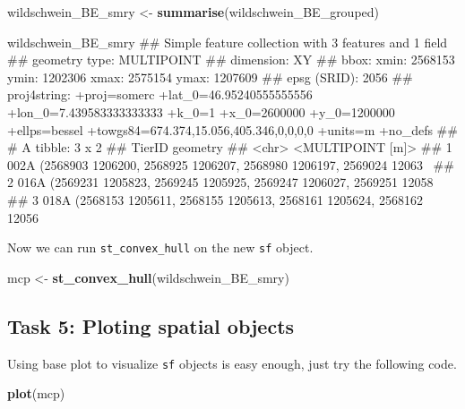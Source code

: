 \documentclass[]{book}
\newenvironment{Shaded}{\begin{snugshade}}{\end{snugshade}}
\newcommand{\KeywordTok}[1]{\textcolor[rgb]{0.13,0.29,0.53}{\textbf{#1}}}
\newcommand{\StringTok}[1]{\textcolor[rgb]{0.31,0.60,0.02}{#1}}
\newcommand{\NormalTok}[1]{#1}
\begin{document}
\begin{Shaded}
\begin{Highlighting}[]
\NormalTok{wildschwein_BE_smry <-}\StringTok{ }\KeywordTok{summarise}\NormalTok{(wildschwein_BE_grouped)}

\NormalTok{wildschwein_BE_smry}
\NormalTok{## Simple feature collection with 3 features and 1 field}
\NormalTok{## geometry type:  MULTIPOINT}
\NormalTok{## dimension:      XY}
\NormalTok{## bbox:           xmin: 2568153 ymin: 1202306 xmax: 2575154 ymax: 1207609}
\NormalTok{## epsg (SRID):    2056}
\NormalTok{## proj4string:    +proj=somerc +lat_0=46.95240555555556 +lon_0=7.439583333333333 +k_0=1 +x_0=2600000 +y_0=1200000 +ellps=bessel +towgs84=674.374,15.056,405.346,0,0,0,0 +units=m +no_defs}
\NormalTok{## # A tibble: 3 x 2}
\NormalTok{##   TierID                                                           geometry}
\NormalTok{##   <chr>                                                    <MULTIPOINT [m]>}
\NormalTok{## 1 002A   (2568903 1206200, 2568925 1206207, 2568980 1206197, 2569024 12063~}
\NormalTok{## 2 016A   (2569231 1205823, 2569245 1205925, 2569247 1206027, 2569251 12058~}
\NormalTok{## 3 018A   (2568153 1205611, 2568155 1205613, 2568161 1205624, 2568162 12056~}
\end{Highlighting}
\end{Shaded}

Now we can run \texttt{st\_convex\_hull} on the new \texttt{sf} object.

\begin{Shaded}
\begin{Highlighting}[]
\NormalTok{mcp <-}\StringTok{ }\KeywordTok{st_convex_hull}\NormalTok{(wildschwein_BE_smry)}
\end{Highlighting}
\end{Shaded}

\subsection{Task 5: Ploting spatial
objects}\label{task-5-ploting-spatial-objects}

Using base plot to visualize \texttt{sf} objects is easy enough, just
try the following code.

\begin{Shaded}
\begin{Highlighting}[]
\KeywordTok{plot}\NormalTok{(mcp)}
\end{Highlighting}
\end{Shaded}
\end{document}

